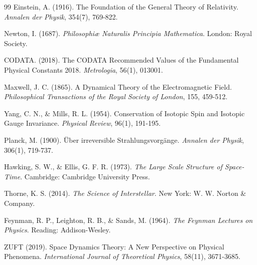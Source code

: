 \documentclass[12pt,twocolumn]{ctexart}
\begin{document}
\begin{thebibliography}{99}
Einstein, A. (1916). The Foundation of the General Theory of Relativity. \textit{Annalen der Physik}, 354(7), 769-822.

Newton, I. (1687). \textit{Philosophiæ Naturalis Principia Mathematica}. London: Royal Society.

CODATA. (2018). The CODATA Recommended Values of the Fundamental Physical Constants 2018. \textit{Metrologia}, 56(1), 013001.

Maxwell, J. C. (1865). A Dynamical Theory of the Electromagnetic Field. \textit{Philosophical Transactions of the Royal Society of London}, 155, 459-512.

Yang, C. N., \& Mills, R. L. (1954). Conservation of Isotopic Spin and Isotopic Gauge Invariance. \textit{Physical Review}, 96(1), 191-195.

Planck, M. (1900). Über irreversible Strahlungsvorgänge. \textit{Annalen der Physik}, 306(1), 719-737.

Hawking, S. W., \& Ellis, G. F. R. (1973). \textit{The Large Scale Structure of Space-Time}. Cambridge: Cambridge University Press.

Thorne, K. S. (2014). \textit{The Science of Interstellar}. New York: W. W. Norton \& Company.

Feynman, R. P., Leighton, R. B., \& Sands, M. (1964). \textit{The Feynman Lectures on Physics}. Reading: Addison-Wesley.

ZUFT (2019). Space Dynamics Theory: A New Perspective on Physical Phenomena. \textit{International Journal of Theoretical Physics}, 58(11), 3671-3685.
\end{thebibliography}
\end{document}

